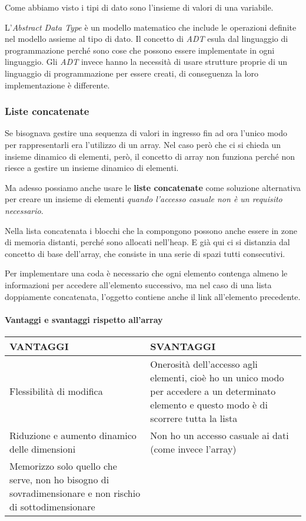 \documentclass[
]{article}
\begin{document}
Come abbiamo visto i tipi di dato sono l'insieme di valori di una
variabile.

L'\emph{Abstract Data Type} è un modello matematico che include le
operazioni definite nel modello assieme al tipo di dato. Il concetto di
\emph{ADT} esula dal linguaggio di programmazione perché sono cose che
possono essere implementate in ogni linguaggio. Gli \emph{ADT} invece
hanno la necessità di usare strutture proprie di un linguaggio di
programmazione per essere creati, di conseguenza la loro implementazione
è differente.

\hypertarget{header-n1153}{%
\subsubsection{Liste concatenate}\label{header-n1153}}

Se bisognava gestire una sequenza di valori in ingresso fin ad ora
l'unico modo per rappresentarli era l'utilizzo di un array. Nel caso
però che ci si chieda un insieme dinamico di elementi, però, il concetto
di array non funziona perché non riesce a gestire un insieme dinamico di
elementi.

Ma adesso possiamo anche usare le \textbf{liste concatenate} come
soluzione alternativa per creare un insieme di elementi \emph{quando
l'accesso casuale non è un requisito necessario}.

Nella lista concatenata i blocchi che la compongono possono anche essere
in zone di memoria distanti, perché sono allocati nell'heap. E già qui
ci si distanzia dal concetto di base dell'array, che consiste in una
serie di spazi tutti consecutivi.

Per implementare una coda è necessario che ogni elemento contenga almeno
le informazioni per accedere all'elemento successivo, ma nel caso di una
lista doppiamente concatenata, l'oggetto contiene anche il link
all'elemento precedente.

\hypertarget{header-n1159}{%
\paragraph{Vantaggi e svantaggi rispetto all'array}\label{header-n1159}}

\begin{longtable}[]{@{}ll@{}}
\toprule
VANTAGGI & SVANTAGGI\tabularnewline
\midrule
\endhead
Flessibilità di modifica & Onerosità dell'accesso agli elementi, cioè ho
un unico modo per accedere a un determinato elemento e questo modo è di
scorrere tutta la lista\tabularnewline
Riduzione e aumento dinamico delle dimensioni & Non ho un accesso
casuale ai dati (come invece l'array)\tabularnewline
Memorizzo solo quello che serve, non ho bisogno di sovradimensionare e
non rischio di sottodimensionare &\tabularnewline
\bottomrule
\end{longtable}
\end{document}
